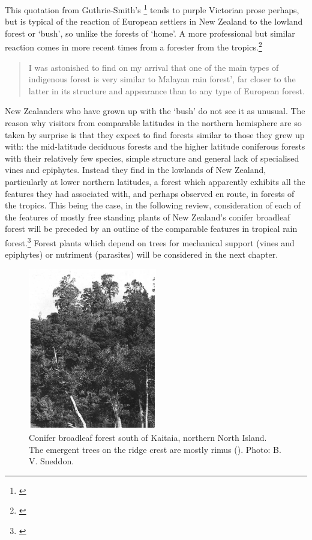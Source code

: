 This quotation from  Guthrie-Smith's \footnote{\cite{guthriesmith1926tutira}} tends to purple Victorian prose perhaps, but is typical of the reaction of European settlers in New Zealand to the lowland forest or `bush', so unlike the forests of `home'.
A more professional but similar reaction comes in more recent times from a forester from the tropics.\footnote{\cite{brown1960forester}}

\begin{quote}
	I was astonished to find on my arrival that one of the main types of indigenous forest is very similar to Malayan rain forest', far closer to the latter in its structure and appearance than to any type of European forest.
\end{quote}

New Zealanders who have grown up with the `bush' do not see it as unusual.
The reason why visitors from comparable latitudes in the northern hemisphere are so taken by surprise is that they expect to find forests similar to those they grew up with: the mid-latitude deciduous forests and the higher latitude coniferous forests with their relatively few species, simple structure and general lack of specialised vines and epiphytes.
Instead they find in the lowlands of New Zealand, particularly at lower northern latitudes, a forest which apparently exhibits all the features they had associated with, and perhaps observed en route, in forests of the tropics.
This being the case, in the following review, consideration of each of the features of mostly free standing plants of New Zealand's conifer broadleaf forest will be preceded by an outline of the comparable features in tropical rain forest.\footnote{\cite{richards1952tropical}}
Forest plants which depend on trees for mechanical support (vines and epiphytes) or nutriment (parasites) will be considered in the next chapter.

\begin{figure}
	\includegraphics[width=0.5\textwidth]{graphics/figure7conifer.jpg}
	\centering
	\caption[Conifer broadleaf forest south of Kaitaia]{Conifer broadleaf forest south of Kaitaia, northern North Island.
The emergent trees on the ridge crest are mostly rimus ().
	Photo: B. V. Sneddon.}%
	\label{fig:7conifer}
\end{figure}

